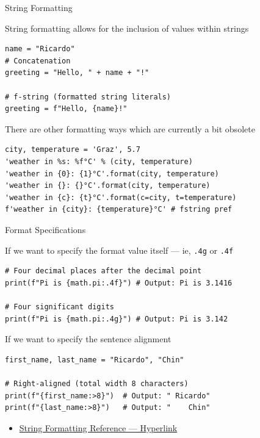 \documentclass[
	11pt, 
]{beamer}
\begin{document}
\begin{frame}[fragile]{String Formatting}

String formatting allows for the inclusion of values within strings

\begin{verbatim}
name = "Ricardo"     
# Concatenation
greeting = "Hello, " + name + "!"

# f-string (formatted string literals)
greeting = f"Hello, {name}!"
\end{verbatim}

There are other formatting ways which are currently a bit obsolete

\begin{verbatim}
city, temperature = 'Graz', 5.7    
'weather in %s: %f°C' % (city, temperature)
'weather in {0}: {1}°C'.format(city, temperature)
'weather in {}: {}°C'.format(city, temperature)
'weather in {c}: {t}°C'.format(c=city, t=temperature)
f'weather in {city}: {temperature}°C' # fstring pref
\end{verbatim}

\end{frame}


\begin{frame}[fragile]{Format Specifications}

If we want to specify the format value itself --- ie, \texttt{.4g} or \texttt{.4f}

\begin{verbatim}
# Four decimal places after the decimal point
print(f"Pi is {math.pi:.4f}") # Output: Pi is 3.1416

# Four significant digits
print(f"Pi is {math.pi:.4g}") # Output: Pi is 3.142
\end{verbatim}

If we want to specify the sentence alignment

\begin{verbatim}
first_name, last_name = "Ricardo", "Chin"

# Right-aligned (total width 8 characters)
print(f"{first_name:>8}")  # Output: " Ricardo"
print(f"{last_name:>8}")   # Output: "    Chin"
\end{verbatim}

\begin{itemize}
    \item \href{https://mkaz.blog/working-with-python/string-formatting/}{String Formatting Reference --- Hyperlink}
\end{itemize}

\end{frame}
\end{document}
